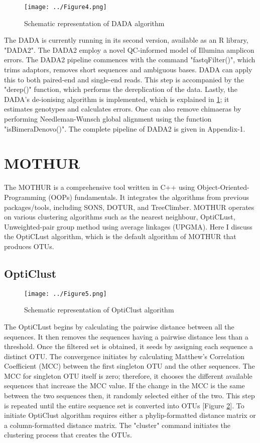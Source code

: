 \begin{figure}
  \centering
  \texttt{[image: ../Figure4.png]}
  \caption{Schematic representation of DADA algorithm}
  \label{fig:figure4}
\end{figure}

The DADA is currently running in its second version, available as an R library, "DADA2". The DADA2 employ a novel QC-informed model of Illumina amplicon errors. The DADA2 pipeline commences with the command "fastqFilter()", which trims adaptors, removes short sequences and ambiguous bases. DADA can apply this to both paired-end and single-end reads. This step is accompanied by the "derep()" function, which performs the dereplication of the data. Lastly, the DADA's de-ionising algorithm is implemented, which is explained in  \ref{fig:figure4}; it estimates genotypes and calculates errors. One can also remove chimaeras by performing Needleman-Wunsch global alignment using the function "isBimeraDenovo()". The complete pipeline of DADA2 is given in Appendix-1.

\section{MOTHUR}
The MOTHUR is a comprehensive tool written in C++ using Object-Oriented-Programming (OOPs) fundamentals. It integrates the algorithms from previous packages/tools, including SONS, DOTUR, and TreeClimber. MOTHUR operates on various clustering algorithms such as the nearest neighbour, OptiCLust, Unweighted-pair group method using average linkages (UPGMA). Here I discuss the OptiCLust algorithm, which is the default algorithm of MOTHUR that produces OTUs.

\subsection{OptiClust}

\begin{figure}[!hb]
  \centering
  \texttt{[image: ../Figure5.png]}
  \caption{Schematic representation of OptiClust algorithm}
  \label{fig:figure5}
\end{figure}

The OptiCLust begins by calculating the pairwise distance between all the sequences. It then removes the sequences having a pairwise distance less than a threshold. Once the filtered set is obtained, it seeds by assigning each sequence a distinct OTU. The convergence initiates by calculating Matthew's Correlation Coefficient (MCC) between the first singleton OTU and the other sequences. The MCC for singleton OTU itself is zero; therefore, it chooses the different available sequences that increase the MCC value. If the change in the MCC is the same between the two sequences then, it randomly selected either of the two. This step is repeated until the entire sequence set is converted into OTUs [Figure \ref{fig:figure5}]. To initiate OptiClust algorithm requires either a phylip-formatted distance matrix or a column-formatted distance matrix. The "cluster" command initiates the clustering process that creates the OTUs.
